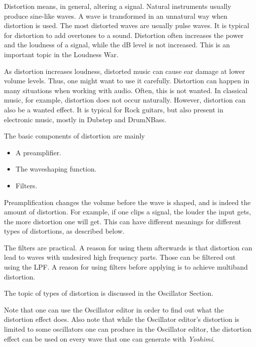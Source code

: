    Distortion means, in general, altering a signal. Natural instruments
   usually produce sine-like waves. A wave is transformed in an unnatural way
   when distortion is used. The most distorted waves are usually pulse waves.
   It is typical for distortion to add overtones to a sound. Distortion often
   increases the power and the loudness of a signal, while the dB level is
   not increased. This is an important topic in the Loudness War.

   As distortion increases loudness, distorted music can cause ear damage at
   lower volume levels. Thus, one might want to use it carefully.
   Distortion can happen in many situations when working with audio. Often,
   this is not wanted. In classical music, for example, distortion does not
   occur naturally. However, distortion can also be a wanted effect. It is
   typical for Rock guitars, but also present in electronic music, mostly in
   Dubstep and DrumNBass.

   The basic components of distortion are mainly

   \begin{itemize}
      \item A preamplifier.
      \item The waveshaping function.
      \item Filters.
   \end{itemize}

   Preamplification changes the volume before the wave is shaped, and is
   indeed the amount of distortion. For example, if one clips a signal, the
   louder the input gets, the more distortion one will get. This can have
   different meanings for different types of distortions, as described below.

   The filters are practical. A reason for using them afterwards is that
   distortion can lead to waves with undesired high frequency parts. Those
   can be filtered out using the LPF. A reason for using filters before
   applying is to achieve multiband distortion.

   The topic of types of distortion is discussed in the
   Oscillator Section.

   Note that one can use the Oscillator editor in order
   to find out what the distortion effect does. Also note that while the
   Oscillator editor’s distortion is limited to some oscillators one can
   produce in the Oscillator editor, the distortion effect can be used on
   every wave that one can generate with \textsl{Yoshimi}.

